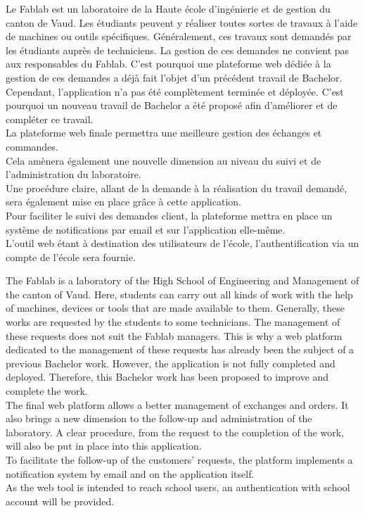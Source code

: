 Le Fablab est un laboratoire de la Haute école d'ingénierie et de gestion du canton de Vaud.
Les étudiants peuvent y réaliser toutes sortes de travaux à l'aide de machines ou outils spécifiques. Généralement, ces travaux sont demandés par les étudiants auprès de techniciens.
La gestion de ces demandes ne convient pas aux responsables du Fablab. C'est pourquoi une plateforme web dédiée à la gestion de ces demandes a déjà fait l'objet d'un précédent travail de Bachelor.
Cependant, l'application n'a pas été complètement terminée et déployée. C'est pourquoi un nouveau travail de Bachelor a été proposé afin d'améliorer et de compléter ce travail.\\
La plateforme web finale permettra une meilleure gestion des échanges et commandes.\\
Cela amènera également une nouvelle dimension au niveau du suivi et de l'administration du laboratoire.\\
Une procédure claire, allant de la demande à la réalisation du travail demandé, sera également mise en place grâce à cette application.\\
Pour faciliter le suivi des demandes client, la plateforme mettra en place un système de notifications par email et sur l'application elle-même.\\
L'outil web étant à destination des utilisateurs de l'école, l'authentification via un compte de l'école sera fournie.

\asterism

The Fablab is a laboratory of the High School of Engineering and Management of the canton of Vaud.
Here, students can carry out all kinds of work with the help of machines, devices or tools that are made available to them. Generally, these works are requested by the students to some technicians.
The management of these requests does not suit the Fablab managers.
This is why a web platform dedicated to the management of these requests has already been the subject of a previous Bachelor work. However, the application is not fully completed and deployed. Therefore, this Bachelor work has been proposed to improve and complete the work. \\
The final web platform allows a better management of exchanges and orders.
It also brings a new dimension to the follow-up and administration of the laboratory.
A clear procedure, from the request to the completion of the work, will also be put in place into this application. \\
To facilitate the follow-up of the customers' requests, the platform implements a notification system by email and on the application itself. \\
As the web tool is intended to reach school users, an authentication with school account will be provided.